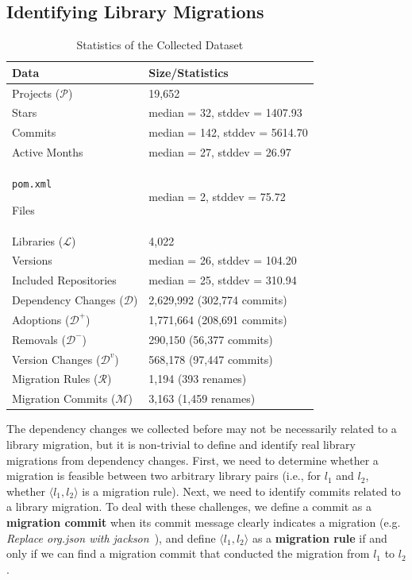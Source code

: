 \documentclass[sigconf, screen]{acmart}
\newcommand{\Code}[1]{\begin{small}\texttt{#1}\end{small}}
\newcommand*{\MyIndent}{\hspace*{0.3cm}}
\begin{document}
\subsection{Identifying Library Migrations}
\label{sec:get-lib-mig}

\begin{table}
  \caption{Statistics of the Collected Dataset}
\vspace{-3mm}
  \label{tab:data}
  \begin{tabular}{ll}
  \toprule
    Data & Size/Statistics \\
    \midrule
    Projects ($\mathcal{P}$) & 19,652 \\
    \MyIndent Stars                    & \MyIndent median = 32, stddev = 1407.93\\
    \MyIndent Commits                  & \MyIndent median = 142, stddev = 5614.70 \\
    \MyIndent Active Months            & \MyIndent median = 27, stddev = 26.97 \\
    \MyIndent \Code{pom.xml} Files     & \MyIndent median = 2, stddev = 75.72 \\
    Libraries ($\mathcal{L}$)          & 4,022 \\
    \MyIndent Versions                 & \MyIndent median = 26, stddev = 104.20\\
    \MyIndent Included Repositories    & \MyIndent median = 25, stddev = 310.94\\
    Dependency Changes ($\mathcal{D}$) & 2,629,992 (302,774 commits) \\
    \MyIndent Adoptions ($\mathcal{D}^+$) & \MyIndent 1,771,664 (208,691 commits)\\
    \MyIndent Removals ($\mathcal{D}^-$) & \MyIndent 290,150 (56,377 commits)\\
    \MyIndent Version Changes ($\mathcal{D}^v$) & \MyIndent 568,178 (97,447 commits)\\
    Migration Rules ($\mathcal{R}$)    & 1,194 (393 renames) \\
    Migration Commits ($\mathcal{M}$)  & 3,163 (1,459 renames) \\
  \bottomrule
  \end{tabular}
\vspace{-4mm}
\end{table}

The dependency changes we collected before may not be necessarily related to a library migration, but it is non-trivial to define and identify real library migrations from dependency changes.
First, we need to determine whether a migration is feasible between two arbitrary library pairs (i.e., for $l_1$ and $l_2$, whether $\langle l_1, l_2 \rangle$ is a migration rule).
Next, we need to identify commits related to a library migration.
To deal with these challenges, we define a commit as a \textbf{migration commit} when its commit message clearly indicates a migration (e.g. \textit{Replace org.json with jackson}~\cite{Commit-replace-json}), and define $\langle l_1, l_2 \rangle$ as a \textbf{migration rule} if and only if we can find a migration commit that conducted the migration from $l_1$ to $l_2$.
\end{document}
